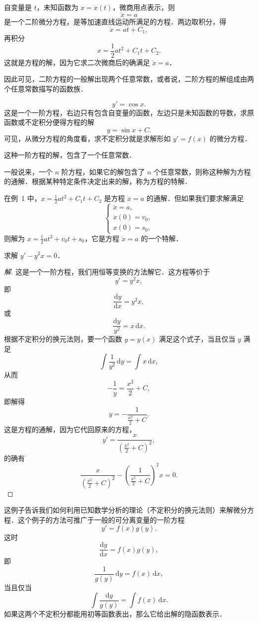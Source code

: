 \begin{example}
自变量是 $t$，未知函数为 $x = x(t)$，微商用点表示，则
\[
\ddot{x} = a
\]
是一个二阶微分方程，是等加速直线运动所满足的方程．两边取积分，得
\[
\dot{x} = at + C_1,
\]
再积分
\[
x = \frac{1}{2}at^2 + C_1 t + C_2.
\]
这就是方程的解，因为它求二次微商后的确满足 $\ddot{x} = a$．

因此可见，二阶方程的一般解出现两个任意常数，或者说，二阶方程的解组成由两个任意常数描写的函数族．
\end{example}

\begin{example}
\[
y' = \cos x.
\]
这是一个一阶方程，右边只有包含自变量的函数，左边只是未知函数的导数，求原函数或不定积分便得方程的解
\[
y = \sin x + C.
\]
可见，从微分方程的角度看，求不定积分就是求解形如 $y' = f(x)$ 的微分方程．
\end{example}

这种一阶方程的解，包含了一个任意常数．

一般说来，一个 $n$ 阶方程，如果它的解包含了 $n$ 个任意常数，则称这种解为方程的通解．根据某种特定条件决定出来的解，称为方程的特解．

在例~1 中，$x = \frac{1}{2}at^2 + C_1 t + C_2$ 是方程 $\ddot{x} = a$ 的通解．但如果我们要求解满足
\[
\begin{cases}
\ddot{x} = a, \\
\dot{x}(0) = v_0, \\
x(0) = s_0,
\end{cases}
\]
则解为 $x = \frac{1}{2}at^2 + v_0 t + s_0$，它是方程 $\ddot{x} = a$ 的一个特解．

\begin{example}
求解 $y' - y^2 x = 0$．
\end{example}

\begin{proof}[解]
这是一个一阶方程，我们用恒等变换的方法解它．这方程等价于
\[
y' = y^2 x,
\]
即
\[
\frac{\mathrm{d}y}{\mathrm{d}x} = y^2 x,
\]
或
\[
\frac{\mathrm{d}y}{y^2} = x\,\mathrm{d}x.
\]
根据不定积分的换元法则，要一个函数 $y = y(x)$ 满足这个式子，当且仅当 $y$ 满足
\[
\int \frac{1}{y^2}\,\mathrm{d}y = \int x\,\mathrm{d}x,
\]
从而
\[
-\frac{1}{y} = \frac{x^2}{2} + C,
\]
即解得
\[
y = -\frac{1}{\frac{x^2}{2} + C}.
\]
这是方程的通解，因为它代回原来的方程，
\[
y' = \frac{x}{\left(\frac{x^2}{2} + C\right)^2},
\]
的确有
\[
\frac{x}{\left(\frac{x^2}{2} + C\right)^2} - \left(\frac{1}{\frac{x^2}{2} + C}\right)^2 x = 0.
\]
\end{proof}

这例子告诉我们如何利用已知数学分析的理论（不定积分的换元法则）来解微分方程．这个例子的方法可推广于一般的可分离变量的一阶方程
\[
y' = f(x)g(y).
\]
这时
\[
\frac{\mathrm{d}y}{\mathrm{d}x} = f(x)g(y),
\]
即
\[
\frac{1}{g(y)}\,\mathrm{d}y = f(x)\,\mathrm{d}x,
\]
当且仅当
\[
\int \frac{\mathrm{d}y}{g(y)} = \int f(x)\,\mathrm{d}x.
\]
如果这两个不定积分都能用初等函数表出，那么它给出解的隐函数表示．

